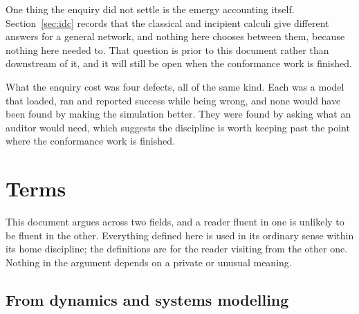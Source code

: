 \documentclass[11pt,a4paper]{article}
\begin{document}
One thing the enquiry did not settle is the emergy accounting itself. Section~\ref{sec:idc} records that the classical and incipient calculi give different answers for a general network, and nothing here chooses between them, because nothing here needed to. That question is prior to this document rather than downstream of it, and it will still be open when the conformance work is finished.

What the enquiry cost was four defects, all of the same kind. Each was a model that loaded, ran and reported success while being wrong, and none would have been found by making the simulation better. They were found by asking what an auditor would need, which suggests the discipline is worth keeping past the point where the conformance work is finished.

\section{Terms}
\label{sec:terms}

This document argues across two fields, and a reader fluent in one is unlikely to be fluent in the other. Everything defined here is used in its ordinary sense within its home discipline; the definitions are for the reader visiting from the other one. Nothing in the argument depends on a private or unusual meaning.

\subsection{From dynamics and systems modelling}
\end{document}
